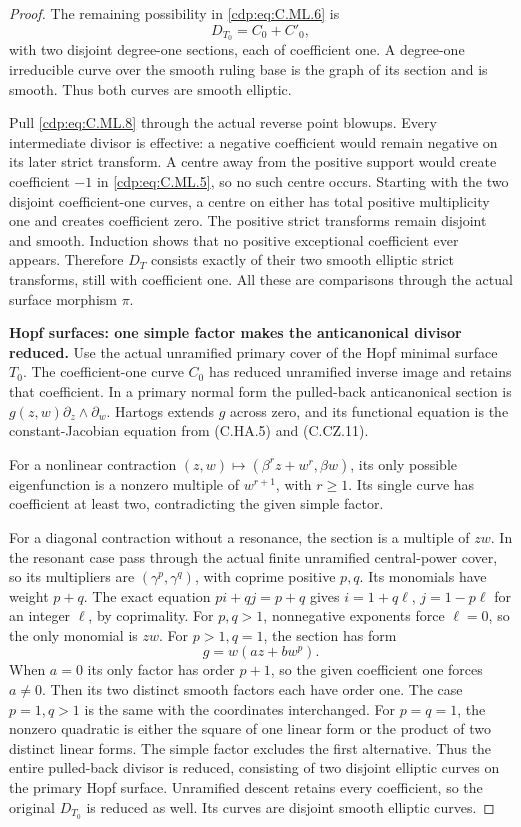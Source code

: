 \begin{proof}
The remaining possibility in \eqref{cdp:eq:C.ML.6} is
\[
                     D_{T_0}=C_0+C'_0,
\tag{C.ML.8}\label{cdp:eq:C.ML.8}
\]
with two disjoint degree-one sections, each of
coefficient one. A degree-one irreducible curve
over the smooth ruling base is the graph of
its section and is smooth. Thus both curves
are smooth elliptic.

Pull \eqref{cdp:eq:C.ML.8} through the actual reverse point
blowups. Every intermediate divisor is effective:
a negative coefficient would remain negative
on its later strict transform. A centre away
from the positive support would create coefficient
\(-1\) in \eqref{cdp:eq:C.ML.5}, so no such centre occurs.
Starting with the two disjoint coefficient-one
curves, a centre on either has total positive
multiplicity one and creates coefficient zero.
The positive strict transforms remain disjoint
and smooth. Induction shows that no positive
exceptional coefficient ever appears. Therefore
\(D_T\) consists exactly of their two smooth
elliptic strict transforms, still with coefficient
one. All these are comparisons through the actual
surface morphism \(\pi\).

\par\medskip\noindent\textbf{Hopf surfaces: one simple factor makes the anticanonical divisor reduced.}
Use the actual unramified primary cover of the
Hopf minimal surface \(T_0\). The coefficient-one
curve \(C_0\) has reduced unramified inverse
image and retains that coefficient. In a primary
normal form the pulled-back anticanonical section
is \(g(z,w)\partial_z\wedge\partial_w\).
Hartogs extends \(g\) across zero, and its
functional equation is the constant-Jacobian
equation from (C.HA.5) and (C.CZ.11).

For a nonlinear contraction
\((z,w)\mapsto(\beta^r z+w^r,\beta w)\), its
only possible eigenfunction is a nonzero multiple
of \(w^{r+1}\), with \(r\ge1\). Its single
curve has coefficient at least two, contradicting
the given simple factor.

For a diagonal contraction without a resonance,
the section is a multiple of \(zw\). In the
resonant case pass through the actual finite
unramified central-power cover, so its multipliers
are \((\gamma^p,\gamma^q)\), with coprime
positive \(p,q\). Its monomials have weight
\(p+q\). The exact equation
\(pi+qj=p+q\) gives
\(i=1+q\ell\), \(j=1-p\ell\) for an integer
\(\ell\), by coprimality. For \(p,q>1\),
nonnegative exponents force \(\ell=0\), so the
only monomial is \(zw\). For \(p>1,q=1\), the section has form
\[
                        g=w(az+bw^p).
\tag{C.ML.9}\label{cdp:eq:C.ML.9}
\]
When \(a=0\) its only factor has order \(p+1\),
so the given coefficient one forces \(a\ne0\).
Then its two distinct smooth factors each have
order one. The case \(p=1,q>1\) is the same
with the coordinates interchanged. For \(p=q=1\),
the nonzero quadratic is either the square of
one linear form or the product of two distinct
linear forms. The simple factor excludes the
first alternative. Thus the entire pulled-back
divisor is reduced, consisting of two disjoint
elliptic curves on the primary Hopf surface.
Unramified descent retains every coefficient,
so the original \(D_{T_0}\) is reduced as well.
Its curves are disjoint smooth elliptic curves.


\end{proof}
